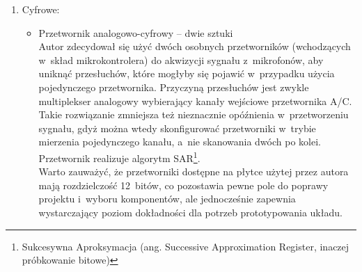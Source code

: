\begin{enumerate}
\begin{itemize}
\begin{figure}[h!]
			\caption{Użyty w~projekcie głośnik.\\ Źródło: https://botland.com.pl/49567-thickbox\_default/glosnik-mg15-01w-8ohm-15x4mm.jpg}
			\label{fig:mg15}
		\end{figure}
		\item Filtr dolnoprzepustowy (antyaliasingowy) -- dwie sztuki\\
		Zanim sygnał zostanie dostarczony do przetwornika A/C, należy zapewnić, by jego częstotliwość nie przekroczyła częstotliwości Nyquista\footnote{Jest to połowa częstotliwości próbkowania sygnału. Przekroczenie jej przez nieodfiltrowany sygnał powoduje pokrycie się dwóch, różnych od siebie sygnałów. Przykład aliasingu: Dla częstotliwości Nyquista równej \SI{1000}{\Hz}, nieodfiltrowany sygnał \SI{3100}{\Hz} zostałby odczytany jako sygnał \SI{100}{\Hz}.}. Pozwala to uniknąć błędnego zakodowania sygnału w~dziedzinie cyfrowej. W~pracy zastosowano pasywny filtr dolnoprzepustowy RC pierwszego rzędu.
	\end{itemize}
	\item Cyfrowe:
	\begin{itemize}
		\item Przetwornik analogowo-cyfrowy -- dwie sztuki\\
		Autor zdecydował się użyć dwóch osobnych przetworników (wchodzących w~skład mikrokontrolera) do akwizycji sygnału z~mikrofonów, aby uniknąć przesłuchów, które mogłyby się pojawić w~przypadku użycia pojedynczego przetwornika. Przyczyną przesłuchów jest zwykle multiplekser analogowy wybierający kanały wejściowe przetwornika A/C. Takie rozwiązanie zmniejsza też nieznacznie opóźnienia w~przetworzeniu sygnału, gdyż można wtedy skonfigurować przetworniki w~trybie mierzenia pojedynczego kanału, a~nie skanowania dwóch po kolei. Przetwornik realizuje algorytm SAR\footnote{Sukcesywna Aproksymacja (ang. Successive Approximation Register, inaczej próbkowanie bitowe)}.\\
		Warto zauważyć, że przetworniki dostępne na płytce użytej przez autora mają rozdzielczość 12~bitów, co pozostawia pewne pole do poprawy projektu i~wyboru komponentów, ale jednocześnie zapewnia wystarczający poziom dokładności dla potrzeb prototypowania układu.

\end{itemize}
\end{enumerate}
